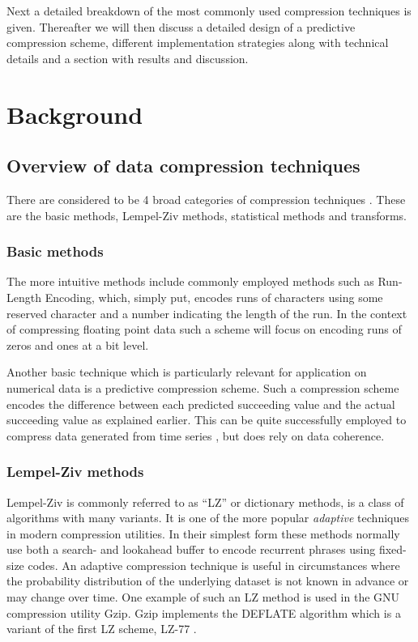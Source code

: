 Next a detailed breakdown of the most commonly used compression techniques is given. Thereafter we will then discuss a detailed design of a predictive compression scheme, 
different implementation strategies along with technical details and a section with results and discussion.
\section{Background}
\subsection{Overview of data compression techniques}
There are considered to be 4 broad categories of compression techniques \cite{salomon2004data}. These are the basic methods, Lempel-Ziv methods, statistical methods 
and transforms.
\subsubsection{Basic methods}
The more intuitive methods include commonly employed methods such as Run-Length Encoding, which, simply put, encodes runs of characters using some reserved 
character and a number indicating the length of the run. In the context of compressing floating point data such a scheme will focus on encoding runs of zeros and ones
at a bit level.

Another basic technique which is particularly relevant for application on numerical data is a predictive compression scheme. Such a compression scheme encodes the 
difference between each predicted succeeding value and the actual succeeding value as explained earlier. This can be quite successfully employed to compress data 
generated from time series \cite{engelson2000lossless}, but does rely on data coherence.
\subsubsection{Lempel-Ziv methods}
Lempel-Ziv is commonly referred to as “LZ” or dictionary methods, is a class of algorithms with many variants. It is one of the more popular \textit{adaptive} techniques 
in modern compression utilities. In their simplest form these methods normally use both a search- and lookahead buffer to encode recurrent phrases using fixed-size codes. An 
adaptive compression technique is useful in circumstances where the probability distribution of the underlying dataset is not known in advance or may change over time. 
One example of such an LZ method is used in the GNU compression utility Gzip. Gzip implements the DEFLATE algorithm which is a variant of the first LZ scheme, LZ-77 
\cite[ch. 3]{salomon2004data}.

